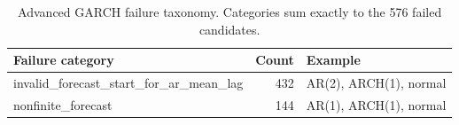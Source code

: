 \begin{table}[!t]
\centering
\caption{Advanced GARCH failure taxonomy. Categories sum exactly to the 576 failed candidates.}
\label{tab:advanced-garch-failure-audit}
\scriptsize
\begin{tabular}{@{}L{0.48\columnwidth}rL{0.32\columnwidth}@{}}
\toprule
Failure category & Count & Example \\
\midrule
invalid\_forecast\_start\_for\_ar\_mean\_lag & 432 & AR(2), ARCH(1), normal \\
nonfinite\_forecast & 144 & AR(1), ARCH(1), normal \\
\bottomrule
\end{tabular}
\end{table}
